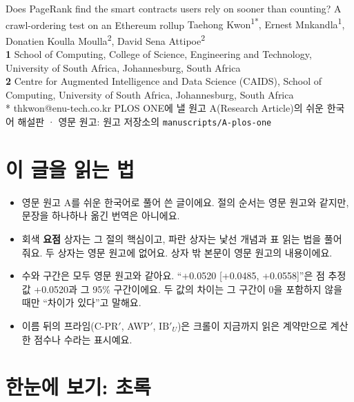 \documentclass[11pt]{article}
\newcommand{\IB}{\mathrm{IB}}
\begin{document}
{Does PageRank find the smart contracts users rely on sooner than counting? A crawl-ordering test on an Ethereum rollup}
{Taehong Kwon\textsuperscript{1*}, Ernest Mnkandla\textsuperscript{1}, Donatien Koulla Moulla\textsuperscript{2}, David Sena Attipoe\textsuperscript{2}\\[0.2em]
\textbf{1} School of Computing, College of Science, Engineering and Technology, University of South Africa, Johannesburg, South Africa\\
\textbf{2} Centre for Augmented Intelligence and Data Science (CAIDS), School of Computing, University of South Africa, Johannesburg, South Africa\\
* thkwon@enu-tech.co.kr}
{PLOS ONE에 낼 원고 A(Research Article)의 쉬운 한국어 해설판 · 영문 원고: 원고 저장소의 \texttt{manuscripts/A-plos-one}}

\section*{이 글을 읽는 법}

\begin{itemize}
\item 영문 원고 A를 쉬운 한국어로 풀어 쓴 글이에요. 절의 순서는 영문 원고와 같지만, 문장을 하나하나 옮긴 번역은 아니에요.
\item 회색 \textsf{\textbf{요점}} 상자는 그 절의 핵심이고, 파란 상자는 낯선 개념과 표 읽는 법을 풀어 줘요. 두 상자는 영문 원고에 없어요. 상자 밖 본문이 영문 원고의 내용이에요.
\item 수와 구간은 모두 영문 원고와 같아요. “+0.0520 [+0.0485, +0.0558]”은 점 추정값 +0.0520과 그 95\% 구간이에요. 두 값의 차이는 그 구간이 0을 포함하지 않을 때만 “차이가 있다”고 말해요.
\item 이름 뒤의 프라임(C-PR$'$, AWP$'$, $\IB'_U$)은 크롤이 지금까지 읽은 계약만으로 계산한 점수나 수라는 표시예요.
\end{itemize}

{\small\setcounter{tocdepth}{1}\tableofcontents}

\section*{한눈에 보기: 초록}
\end{document}
